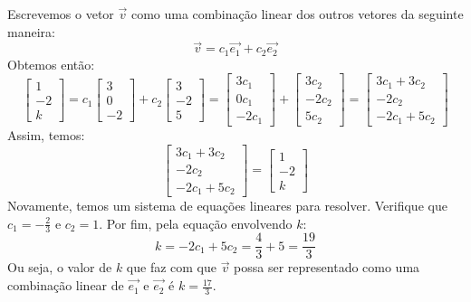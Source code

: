 \begin{resol}
 Escrevemos o vetor $\vec{v}$ como uma combinação linear dos outros vetores da seguinte maneira:
\begin{equation}
\vec{v} = c_1\vec{e_1} + c_2\vec{e_2}
\end{equation}
Obtemos então:
\begin{equation}
\left[
  \begin{array}{c}
  1 \\
  -2 \\
  k
 \end{array}
\right] =
c_1\left[
  \begin{array}{c}
  3 \\
  0 \\
  -2
 \end{array}
\right] +
c_2\left[
  \begin{array}{c}
  3 \\
  -2 \\
  5
 \end{array}
\right] =
\left[
  \begin{array}{c}
  3c_1 \\
  0c_1 \\
  -2c_1
 \end{array}
\right] +
\left[
  \begin{array}{c}
  3c_2 \\
  -2c_2 \\
  5c_2
 \end{array}
\right] =
\left[
\begin{array}{c}
 3c_1 + 3c_2 \\
 -2c_2 \\
 -2c_1+5c_2
\end{array}
\right]
\end{equation}
Assim, temos:
\begin{equation}
\left[
\begin{array}{c}
 3c_1 + 3c_2 \\
 -2c_2 \\
 -2c_1+5c_2
\end{array}
\right] =
\left[
 \begin{array}{c}
  1 \\
  -2 \\
  k
 \end{array}
\right]
\end{equation}
Novamente, temos um sistema de equações lineares para resolver. Verifique que $c_1 = -\frac{2}{3}$ e $c_2 = 1$. Por fim, pela equação envolvendo $k$:
\begin{equation}
 k = -2c_1+5c_2 = \frac{4}{3} + 5 = \frac{19}{3}
\end{equation}
Ou seja, o valor de $k$ que faz com que $\vec{v}$ possa ser representado como uma combinação linear de $\vec{e_1}$ e $\vec{e_2}$ é $k = \frac{17}{3}$.
\end{resol}



